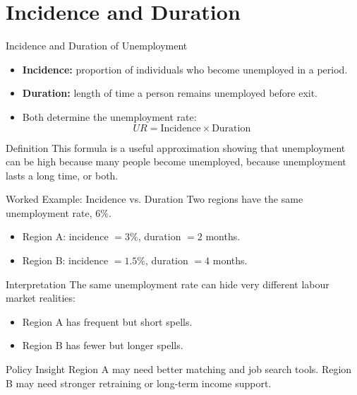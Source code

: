 \documentclass[aspectratio=169]{beamer}
\begin{document}
\section{Incidence and Duration}

\begin{frame}{Incidence and Duration of Unemployment}
\transfade
\begin{itemize}
  \item \textbf{Incidence:} proportion of individuals who become unemployed in a period.
  \item \textbf{Duration:} length of time a person remains unemployed before exit.
  \item Both determine the unemployment rate:
  \[
  UR = \text{Incidence} \times \text{Duration}
  \]
\end{itemize}

\begin{block}{Definition}
This formula is a useful approximation showing that unemployment can be high because many people become unemployed, because unemployment lasts a long time, or both.
\end{block}
\end{frame}

\begin{frame}{Worked Example: Incidence vs. Duration}
\transfade
Two regions have the same unemployment rate, \(6\%\).

\begin{itemize}
  \item Region A: incidence \(= 3\%\), duration \(= 2\) months.
  \item Region B: incidence \(= 1.5\%\), duration \(= 4\) months.
\end{itemize}

\begin{block}{Interpretation}
The same unemployment rate can hide very different labour market realities:
\begin{itemize}
  \item Region A has frequent but short spells.
  \item Region B has fewer but longer spells.
\end{itemize}
\end{block}

\begin{exampleblock}{Policy Insight}
Region A may need better matching and job search tools. Region B may need stronger retraining or long-term income support.
\end{exampleblock}
\end{frame}
\end{document}
